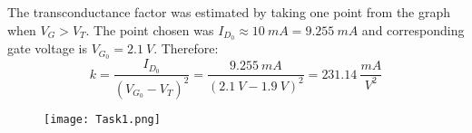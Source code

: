 The transconductance factor was estimated by taking one point from the graph when $V_G > V_T$. The point chosen was $I_{D_0} \approx 10 \ mA = 9.255 \ mA $ and corresponding gate voltage is $V_{G_0} = 2.1 \ V$. Therefore: $$ k = \dfrac{I_{D_0}}{(V_{G_0}-V_T)^2} = \dfrac{9.255 \ mA}{(2.1 \ V - 1.9 \ V)^2} = 231.14 \ \dfrac{mA}{V^2} $$

\begin{figure}[h!]
        \centering
        \texttt{[image: Task1.png]}
\end{figure}

